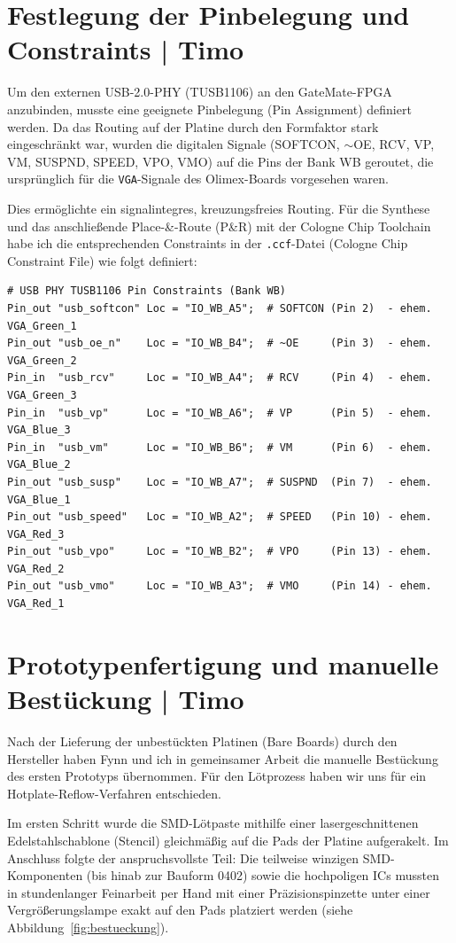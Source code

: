 \documentclass[a4paper,11pt]{article}
\begin{document}
\section{Festlegung der Pinbelegung und Constraints | Timo}

Um den externen USB-2.0-PHY (TUSB1106) an den GateMate-FPGA anzubinden, musste eine geeignete Pinbelegung (Pin Assignment) definiert werden. Da das Routing auf der Platine durch den Formfaktor stark eingeschränkt war, wurden die digitalen Signale (SOFTCON, $\sim$OE, RCV, VP, VM, SUSPND, SPEED, VPO, VMO) auf die Pins der Bank WB geroutet, die ursprünglich für die \texttt{VGA}-Signale des Olimex-Boards vorgesehen waren.

Dies ermöglichte ein signalintegres, kreuzungsfreies Routing. Für die Synthese und das anschließende Place-\&-Route (P\&R) mit der Cologne Chip Toolchain habe ich die entsprechenden Constraints in der \texttt{.ccf}-Datei (Cologne Chip Constraint File) wie folgt definiert:

\begin{verbatim}
# USB PHY TUSB1106 Pin Constraints (Bank WB)
Pin_out "usb_softcon" Loc = "IO_WB_A5";  # SOFTCON (Pin 2)  - ehem. VGA_Green_1
Pin_out "usb_oe_n"    Loc = "IO_WB_B4";  # ~OE     (Pin 3)  - ehem. VGA_Green_2
Pin_in  "usb_rcv"     Loc = "IO_WB_A4";  # RCV     (Pin 4)  - ehem. VGA_Green_3
Pin_in  "usb_vp"      Loc = "IO_WB_A6";  # VP      (Pin 5)  - ehem. VGA_Blue_3
Pin_in  "usb_vm"      Loc = "IO_WB_B6";  # VM      (Pin 6)  - ehem. VGA_Blue_2
Pin_out "usb_susp"    Loc = "IO_WB_A7";  # SUSPND  (Pin 7)  - ehem. VGA_Blue_1
Pin_out "usb_speed"   Loc = "IO_WB_A2";  # SPEED   (Pin 10) - ehem. VGA_Red_3
Pin_out "usb_vpo"     Loc = "IO_WB_B2";  # VPO     (Pin 13) - ehem. VGA_Red_2
Pin_out "usb_vmo"     Loc = "IO_WB_A3";  # VMO     (Pin 14) - ehem. VGA_Red_1
\end{verbatim}

\section{Prototypenfertigung und manuelle Bestückung | Timo}

Nach der Lieferung der unbestückten Platinen (Bare Boards) durch den Hersteller haben Fynn und ich in gemeinsamer Arbeit die manuelle Bestückung des ersten Prototyps übernommen. Für den Lötprozess haben wir uns für ein Hotplate-Reflow-Verfahren entschieden.

Im ersten Schritt wurde die SMD-Lötpaste mithilfe einer lasergeschnittenen Edelstahlschablone (Stencil) gleichmäßig auf die Pads der Platine aufgerakelt. Im Anschluss folgte der anspruchsvollste Teil: Die teilweise winzigen SMD-Komponenten (bis hinab zur Bauform 0402) sowie die hochpoligen ICs mussten in stundenlanger Feinarbeit per Hand mit einer Präzisionspinzette unter einer Vergrößerungslampe exakt auf den Pads platziert werden (siehe Abbildung~\ref{fig:bestueckung}).
\end{document}
